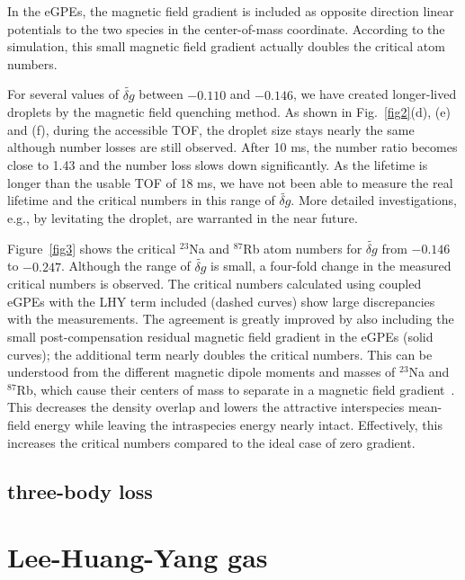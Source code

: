 In the eGPEs, the magnetic field gradient is included as opposite direction linear potentials to the two species in the center-of-mass coordinate. 
According to the simulation, this small magnetic field gradient actually doubles the critical atom numbers.

For several values of $\widetilde{\delta g}$ between $-0.110$ and $-0.146$, we have created longer-lived droplets by the magnetic field quenching method. As shown in Fig.~\ref{fig2}(d), (e) and (f), during the accessible TOF, the droplet size stays nearly the same although number losses are still observed. After 10 ms, the number ratio becomes close to 1.43 and the number loss slows down significantly. As the lifetime is longer than the usable TOF 
of 18 ms, we have not been able to measure the real lifetime and the critical numbers in this range of $\widetilde{\delta g}$. More detailed investigations, e.g., by levitating the droplet, are warranted in the near future.




Figure~\ref{fig3} shows the critical $^{23}$Na and $^{87}$Rb atom numbers for $\widetilde{\delta g}$ from $-0.146$ to $-0.247$.
Although the range of $\widetilde{\delta g}$ is small, a four-fold change in the measured critical numbers is observed. 
The critical numbers calculated using coupled eGPEs with the LHY term included (dashed curves) show large discrepancies with the measurements. The agreement is greatly improved by also including the small post-compensation residual magnetic field gradient in the eGPEs (solid curves); the additional term nearly doubles  the critical numbers. This can be understood from the different magnetic dipole moments and masses of $^{23}$Na and $^{87}$Rb, which cause their centers of mass to separate in a magnetic field gradient~\cite{SM}. This decreases the density overlap and lowers the attractive interspecies mean-field energy while leaving the intraspecies energy nearly intact. Effectively, this increases the critical numbers compared to the ideal case of zero gradient.

\subsection{three-body loss}

\section{Lee-Huang-Yang gas}
